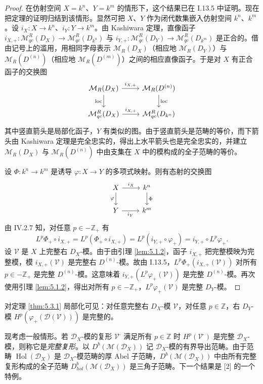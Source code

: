 \begin{proof}
在仿射空间 $X=k^n$、$Y=k^m$ 的情形下，这个结果已在 I.13.5 中证明。现在把定理的证明归结到该情形。显然可把 $X$、$Y$ 作为闭代数集嵌入仿射空间 $k^n$、$k^m$。设
$i_X:X\to k^n$、$i_Y:Y\to k^m$。由 Kashiwara 定理，直像函子
$i_{X,+}:\mathcal{M}^R_{qc}(D_X)\to\mathcal{M}^R_{qc}(D_{k^n})$ 与
$i_{Y,+}:\mathcal{M}^R_{qc}(D_Y)\to\mathcal{M}^R_{qc}(D_{k^m})$ 是正合的。借由记号上的滥用，用相同字母表示 $\mathcal{M}_R(D_X)$（相应地 $\mathcal{M}_R(D_Y)$）与 $\mathcal{M}_R(D^{(n)})$（相应地 $\mathcal{M}_R(D^{(m)})$）之间的相应直像函子。于是对 $X$ 有正合函子的交换图
$$\begin{tikzcd}
\mathcal{M}_R(D_X) \arrow[r,"i_{X,+}"] \arrow[d,"\operatorname{loc}"' ] &
\mathcal{M}_R(D^{(n)}) \arrow[d,"\operatorname{loc}"]\\
\mathcal{M}^R_{qc}(D_X) \arrow[r,"i_{X,+}"] & \mathcal{M}^R_{qc}(D_{k^n})
\end{tikzcd}$$
其中竖直箭头是局部化函子，$Y$ 有类似的图。由于竖直箭头是范畴的等价，而下箭头由 Kashiwara 定理是完全忠实的，得出上水平箭头也是完全忠实的，并建立 $\mathcal{M}_R(D_X)$ 与 $\mathcal{M}_R(D^{(n)})$ 中由支集在 $X$ 中的模构成的全子范畴的等价。

设 $\Phi:k^n\to k^m$ 是诱导 $\varphi:X\to Y$ 的多项式映射。则有态射的交换图
$$\begin{tikzcd}
X \arrow[r,"i_X"] \arrow[d,"\varphi"'] & k^n \arrow[d,"\Phi"]\\
Y \arrow[r,"i_Y"'] & k^m
\end{tikzcd}$$
由 IV.2.7 知，对任意 $p\in-\mathbb{Z}_+$ 有
$$L^p\Phi_+\circ i_{X,+}=L^p(\Phi_+\circ i_{X,+})=L^p(i_{Y,+}\circ\varphi_+)=i_{Y,+}\circ L^p\varphi_+.$$
设 $\mathcal{V}$ 是 $X$ 上完整右 $D_X$-模。由于由引理 \ref{lem:5.1.2}，函子 $i_{X,+}$ 把完整模映为完整模，模 $i_{X,+}(\mathcal{V})$ 是完整右 $D^{(n)}$-模。故由 I.13.5，$L^p\Phi_+(i_{X,+}(\mathcal{V}))$ 对所有 $p\in-\mathbb{Z}_+$ 是完整 $D^{(n)}$-模。这意味着 $i_{Y,+}(L^p\varphi_+(\mathcal{V}))$ 是完整 $D^{(n)}$-模。再次使用引理 \ref{lem:5.1.2}，得出对所有 $p\in-\mathbb{Z}_+$，$L^p\varphi_+(\mathcal{V})$ 是完整 $D_Y$-模。
\end{proof}

对定理 \ref{thm:5.3.1} 局部化可见：对任意完整右 $D_X$-模 $\mathcal{V}$，对任意 $p\in\mathbb{Z}$，右 $D_Y$-模 $H^p(\varphi_+(\mathcal{D}(\mathcal{V})))$ 是完整的。

现考虑一般情形。若 $\mathcal{D}_X$-模的复形 $\mathcal{V}^\cdot$ 满足所有 $p\in\mathbb{Z}$ 时 $H^p(\mathcal{V}^\cdot)$ 是完整 $\mathcal{D}_X$-模，则称它是\emph{完整复形}。以 $D^b(\mathcal{M}(\mathcal{D}_X))$ 记 $\mathcal{D}_X$-模的有界导出范畴。由于范畴 $\operatorname{Hol}(\mathcal{D}_X)$ 是 $\mathcal{D}_X$-模范畴的厚 Abel 子范畴，$D^b(\mathcal{M}(\mathcal{D}_X))$ 中由所有完整复形构成的全子范畴
$D^b_{hol}(\mathcal{M}(\mathcal{D}_X))$ 是三角子范畴。下一个结果是 [2] 的一个特例。


